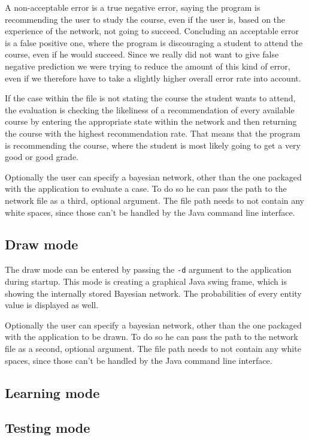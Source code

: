 \documentclass[%
	pdftex,
	oneside,        %
	11pt,           %
	parskip=half,   %
	headsepline,    %
	footsepline,    %
	abstracton,     %
	USenglish,      %
	a4paper,        %
]{report}
\begin{document}
A non-acceptable error is a true negative error, saying the program is recommending the user to study the course, even if the user is, based on the experience of the network, not going to succeed. Concluding an acceptable error is a false positive one, where the program is discouraging a student to attend the course, even if he would succeed. Since we really did not want to give false negative prediction we were trying to reduce the amount of this kind of error, even if we therefore have to take a slightly higher overall error rate into account.

If the case within the file is not stating the course the student wants to attend, the evaluation is checking the likeliness of a recommendation of every available course by entering the appropriate state within the network and then returning the course with the highest recommendation rate. That means that the program is recommending the course, where the student is most likely going to get a very good or good grade.

Optionally the user can specify a bayesian network, other than the one packaged with the application to evaluate a case. To do so he can pass the path to the network file as a third, optional argument. The file path needs to not contain any white spaces, since those can't be handled by the Java command line interface.

\subsection{Draw mode}
The draw mode can be entered by passing the \texttt{-d} argument to the application during startup. This mode is creating a graphical Java swing frame, which is showing the internally stored Bayesian network. The probabilities of every entity value is displayed as well.

Optionally the user can specify a bayesian network, other than the one packaged with the application to be drawn. To do so he can pass the path to the network file as a second, optional argument. The file path needs to not contain any white spaces, since those can't be handled by the Java command line interface.

\subsection{Learning mode}

\subsection{Testing mode}
\label{sec:Test}
\end{document}
